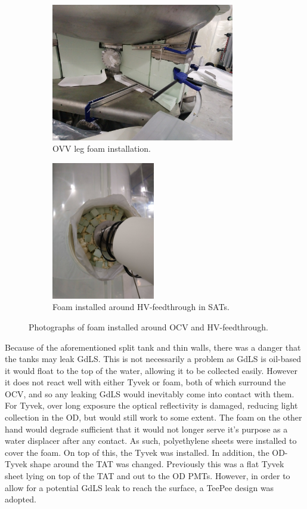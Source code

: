 \begin{figure}[!tbph]
\begin{subfigure}{.5\textwidth}
  \centering
  \includegraphics[height=6cm, width=\linewidth]{Figures/Construction/BAT_green_foam.JPG}
  \caption{OVV leg foam installation.}
  \label{fig:ocv_leg_foam}
  \end{subfigure}
  \begin{subfigure}{.5\textwidth}
  \centering
  \includegraphics[height=6cm, width=\linewidth]{Figures/Construction/HV_foam.jpg}
  \caption{Foam installed around HV-feedthrough in SATs.}
  \label{fig:hv_port_foam}
  \end{subfigure}
\caption{Photographs of foam installed around OCV and HV-feedthrough.}
\label{fig:Additional_foam_installation}
\end{figure}

\par
Because of the aforementioned split tank and thin walls, there was a danger that the tanks may leak GdLS.
This is not necessarily a problem as GdLS is oil-based it would float to the top of the water, allowing it to be collected easily.
However it does not react well with either Tyvek or foam, both of which surround the OCV, and so any leaking GdLS would inevitably come into contact with them.
For Tyvek, over long exposure the optical reflectivity is damaged, reducing light collection in the OD, but would still work to some extent.
The foam on the other hand would degrade sufficient that it would not longer serve it's purpose as a water displacer after any contact.
As such, polyethylene sheets were installed to cover the foam.
On top of this, the Tyvek was installed.
In addition, the OD-Tyvek shape around the TAT was changed.
Previously this was a flat Tyvek sheet lying on top of the TAT and out to the OD PMTs.
However, in order to allow for a potential GdLS leak to reach the surface, a TeePee design was adopted.

